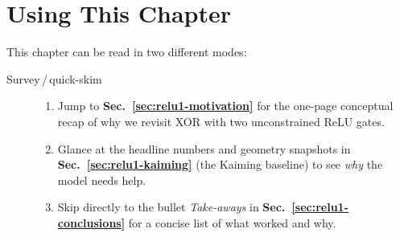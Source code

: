 \section{Using This Chapter}
\label{sec:relu1-using}

This chapter can be read in two different modes:

\begin{description}
  \item[Survey\,/\,quick-skim]
        \begin{enumerate}
          \item Jump to \textbf{Sec.~\ref{sec:relu1-motivation}} for the one-page conceptual recap of why we revisit XOR with two unconstrained ReLU gates.
          \item Glance at the headline numbers and geometry snapshots in \textbf{Sec.~\ref{sec:relu1-kaiming}} (the Kaiming baseline) to see \emph{why} the model needs help.
          \item Skip directly to the bullet \emph{Take-aways} in \textbf{Sec.~\ref{sec:relu1-conclusions}} for a concise list of what worked and why.
        \end{enumerate}


\end{description}
